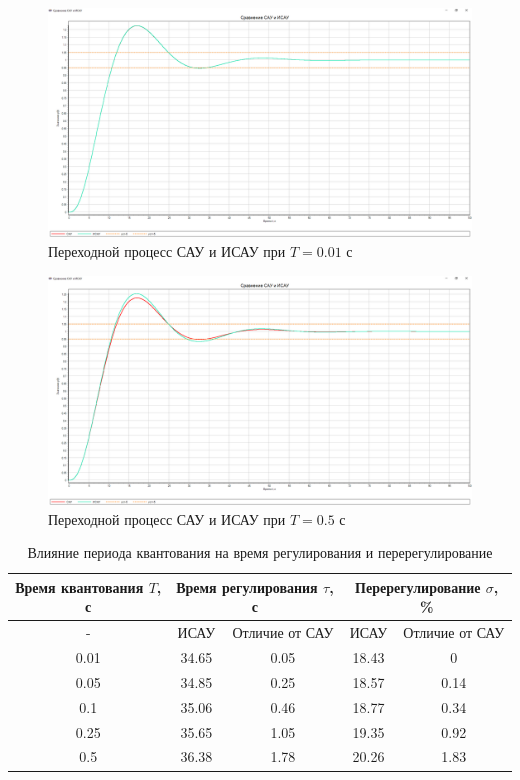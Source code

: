 	\begin{figure}[h]
		\centering\includegraphics[width=.75\textwidth]{png/graph1.png}
		\caption{Переходной процесс САУ и ИСАУ при $T=0.01$ с}
		\label{graph1}
	\end{figure}
	
	\begin{figure}[h]
		\centering\includegraphics[width=.75\textwidth]{png/graph2.png}
		\caption{Переходной процесс САУ и ИСАУ при $T=0.5$ с}
		\label{graph2}
	\end{figure}
	

	
	\begin{table}
		\begin{tabular}{|c|cc|cc|}
			\hline
			Время квантования $T$, с & \multicolumn{2}{c|}{Время регулирования $\tau$, с} & \multicolumn{2}{c|}{Перерегулирование $\sigma$, \%} \\ \hline
			-                     & \multicolumn{1}{c|}{ИСАУ}   & Отличие от САУ & \multicolumn{1}{c|}{ИСАУ}  & Отличие от САУ \\ \hline
			0.01                  & \multicolumn{1}{c|}{34.65}  & 0.05           & \multicolumn{1}{c|}{18.43} & 0              \\ \hline
			0.05                  & \multicolumn{1}{c|}{34.85}  & 0.25           & \multicolumn{1}{c|}{18.57} & 0.14           \\ \hline
			0.1                   & \multicolumn{1}{c|}{35.06}  & 0.46           & \multicolumn{1}{c|}{18.77} & 0.34           \\ \hline
			0.25                  & \multicolumn{1}{c|}{35.65}  & 1.05           & \multicolumn{1}{c|}{19.35} & 0.92           \\ \hline
			0.5                   & \multicolumn{1}{c|}{36.38}  & 1.78           & \multicolumn{1}{c|}{20.26} & 1.83           \\ \hline
		\end{tabular}
		\caption{Влияние периода квантования на время регулирования и перерегулирование}
		\label{din_table}
	\end{table}
	
